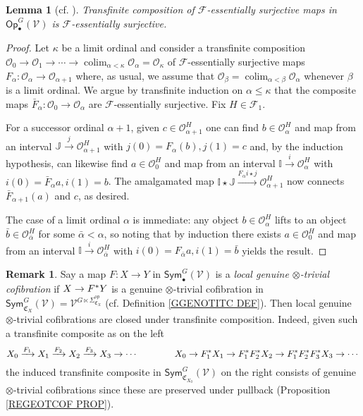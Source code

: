 \documentclass[a4paper,10pt
,draft
]{article}%
\numberwithin{equation}{section}
\numberwithin{figure}{section}
\newtheorem{lemma}[equation]{Lemma}%
\theoremstyle{definition} %
\newtheorem{remark}[equation]{Remark}%
\newcommand{\Op}{\mathsf{Op}}%
\DeclareMathOperator{\colim}{colim}%
\newcommand{\F}{\ensuremath{\mathcal F}}
\newcommand{\V}{\ensuremath{\mathcal V}}
\renewcommand{\O}{\ensuremath{\mathcal O}}
\newcommand{\1}{\ensuremath{\mathbbm 1}}%
\begin{document}
\begin{lemma}[cf. {\cite[4.17]{Cav}}] \label{TRANSCOMP_ES_LEM}
	Transfinite composition of $\F$-essentially surjective maps in $\Op^G_\bullet(\V)$ is $\F$-essentially surjective.
\end{lemma}



\begin{proof}
Let $\kappa$ be a limit ordinal and consider a transfinite composition
$\O_0 \to \O_1 \to \cdots 
\to \colim_{\alpha < \kappa} \O_{\alpha} = \O_{\kappa}$
of $\F$-essentially surjective maps
$F_{\alpha} \colon \O_{\alpha} \to \O_{\alpha +1}$ where, as usual, 
we assume that $\O_{\beta} = \colim_{\alpha < \beta} \O_{\alpha}$ whenever $\beta$ is a limit ordinal.
We argue by transfinite induction on $\alpha \leq \kappa$
that the composite maps $\bar{F}_{\alpha} \colon \O_0 \to \O_{\alpha}$
are $\F$-essentially surjective. Fix $H \in \F_1$.

For a successor ordinal $\alpha+1$, given $c \in \O_{\alpha+1}^H$
one can find $b \in \O_\alpha^H$ and map from an interval 
$\mathbb{J} \xrightarrow{j} \O_{\alpha+1}^H$ with $j(0) = F_{\alpha}(b),j(1)=c$
and, by the induction hypothesis, can likewise find
$a \in \O_0^H$ and map from an interval $\mathbb{I} \xrightarrow{i} \O_\alpha^H$
with $i(0)=\bar{F}_{\alpha}a,i(1)=b$.
The amalgamated map
$\mathbb{I} \star \mathbb{J} \xrightarrow{F_{\alpha}i \star j} \O_{\alpha+1}^H$
now connects $\bar{F}_{\alpha+1}(a)$ and $c$, as desired.

The case of a limit ordinal $\alpha$ is immediate: any object $b \in \O_{\alpha}^H$
lifts to an object $\bar{b} \in \O_{\bar{\alpha}}^H$ for some $\bar{\alpha} < \alpha$,
so noting that by induction there exists $a \in \O_0^H$ and map from an interval $\mathbb{I} \xrightarrow{i} \O_{\bar{\alpha}}^H$
with $i(0) = F_{\bar{\alpha}}a,i(1) = \bar{b}$ yields the result.
\end{proof}



\begin{remark}\label{LOCOTIMESTRI REM}
	Say a map $F \colon X \to Y$ in 
	$\mathsf{Sym}^{G}_{\bullet}(\V)$
	is a \emph{local genuine $\otimes$-trivial cofibration}
	if  
	$X \to F^{\**}Y$ is a 
	genuine $\otimes$-trivial cofibration in 
	$\mathsf{Sym}^{G}_{\mathfrak{C}_X}(\V) = \V^{G \ltimes \Sigma^{op}_{\mathfrak{C}_{X}}}$
	(cf. Definition \ref{GGENOTITC DEF}).
Then local genuine $\otimes$-trivial cofibrations are closed under transfinite composition.
Indeed, given such a transfinite composite as on the left
\[
X_0 \xrightarrow{F_1} 
X_1 \xrightarrow{F_2}
X_2 \xrightarrow{F_3}
X_3 \to \cdots 
\qquad \qquad 
X_0 \to  
F_1^{\**} X_1 \to
F_1^{\**}F_2^{\**}X_2 \to
F_1^{\**}F_2^{\**}F_3^{\**}X_3 \to \cdots 
\]
the induced transfinite composite in $\mathsf{Sym}^{G}_{\mathfrak{C}_{X_0}}(\V)$
on the right consists of 
genuine $\otimes$-trivial cofibrations
since these are preserved under pullback
(Proposition \ref{REGEOTCOF PROP}).
\end{remark}
\end{document}
